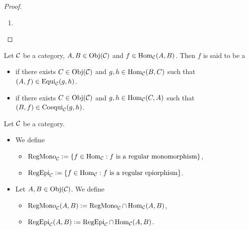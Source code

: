 \documentclass{book}
\begin{document}
\begin{proof}
\begin{enumerate}
			\[ 
			\begin{tikzcd}[baseline= 7]
				C \arrow[dr, "\al"]&                                   & \\
				& E \arrow[r, "m"] & A  \\
				C \arrow[ur, "\be"']&                                   & \\
			\end{tikzcd}
			\implies
			\begin{tikzcd}[baseline= 7]
				C \arrow[bend right=60, swap]{r}{\be} \arrow[bend right=-60]{r}{\al} & E  \\
			\end{tikzcd}
			\]
			Thus $m \in \Mono_{\MC}(E, A)$.
			\item {}
		\end{enumerate}
	\end{proof}
	
	\begin{defn}
		Let $\mathcal{C}$ be a category, $A, B \in \operatorname{Obj}(\mathcal{C})$ and $f \in \operatorname{Hom}_{\mathcal{C}}(A,B)$. Then $f$ is said to be a 
		\begin{itemize}
			\item {} if there exists $C \in \operatorname{Obj}(\mathcal{C})$ and $g,h \in \operatorname{Hom}_{\mathcal{C}}(B,C)$ such that $(A,f) \in \operatorname{Equi}_{\mathcal{C}}(g,h)$.
			\item {} if there exists $C \in \operatorname{Obj}(\mathcal{C})$ and $g,h \in \operatorname{Hom}_{\mathcal{C}}(C,A)$ such that $(B,f) \in \operatorname{Coequi}_{\mathcal{C}}(g,h)$.
		\end{itemize}
	\end{defn}
	
	\begin{defn}
		Let $\mathcal{C}$ be a category.
		\begin{itemize}
			\item We define 
			\begin{itemize}
				\item $\operatorname{RegMono}_{\mathcal{C}} \vcentcolon= \{f \in \operatorname{Hom}_{\mathcal{C}}: \text{$f$ is a regular monomorphism}\}$,
				\item $\operatorname{RegEpi}_{\mathcal{C}} \vcentcolon= \{f \in \operatorname{Hom}_{\mathcal{C}}: \text{$f$ is a regular epiorphism}\}$.
			\end{itemize}
			\item Let $A,B \in \operatorname{Obj}(\mathcal{C})$. We define 
			\begin{itemize}
				\item $\operatorname{RegMono}_{\mathcal{C}}(A,B) \vcentcolon= \operatorname{RegMono}_{\mathcal{C}} \cap \operatorname{Hom}_{\mathcal{C}}(A,B)$,
				\item $\operatorname{RegEpi}_{\mathcal{C}}(A,B) \vcentcolon= \operatorname{RegEpi}_{\mathcal{C}} \cap \operatorname{Hom}_{\mathcal{C}}(A,B)$.
			\end{itemize}
		\end{itemize}
	\end{defn}
	
\end{document}

